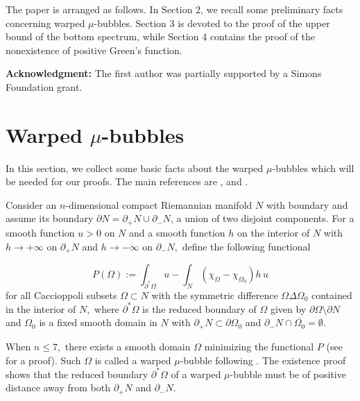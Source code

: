 \documentclass{amsart}
\numberwithin{equation}{section}
\begin{document}
The paper is arranged as follows. In Section 2, we recall some preliminary facts concerning warped $\mu$-bubbles. Section 3 is devoted to the proof 
of the upper bound of the bottom spectrum, while Section 4 contains the proof of the nonexistence of positive Green's function.



\textbf{Acknowledgment:}   The first author was
partially supported by a Simons Foundation
grant.

\section{Warped $\mu$-bubbles}

In this section, we collect some basic facts about the warped $\mu$-bubbles which will be needed for our proofs.
The main references are \cite{Z}, \cite{G} and \cite{CL}. 

Consider an $n$-dimensional compact Riemannian manifold $N$ with boundary and assume its boundary $\partial N=\partial_{+} N\cup \partial_{-}N$, a union of two
disjoint components. For a smooth function $u>0$ on $N$ and a smooth function $h$ on the interior of $N$ with $h\to +\infty$ on $\partial_{+} N$ and $h\to -\infty$ 
on $\partial_{-} N,$ define the following functional 

\begin{equation}
P\left( \Omega \right) :=\int_{\partial ^{\ast }\Omega }u-\int_{N}\left(
\chi _{\Omega }-\chi _{\Omega _{0}}\right) h\,u \label{P}
\end{equation}
for all Caccioppoli subsets $\Omega\subset N$ with the symmetric difference
$\Omega\Delta \Omega_0$ contained in the interior of $N,$ where 
$\partial ^{\ast }\Omega$ is the reduced boundary of $\Omega$
given by $\partial \Omega\setminus \partial N$ and $\Omega_0$ is a fixed smooth domain in $N$
with $\partial_{+} N\subset \partial \Omega_0$ and $\partial_{-} N\cap \overline{\Omega_0}=\emptyset.$

When $n\leq 7,$ there exists a smooth domain $\Omega$ minimizing the functional $P$ (see \cite{Z, CL} for a proof). 
Such $\Omega$ is called a warped $\mu$-bubble following \cite{CL}. The existence proof shows that the reduced boundary
$\partial ^{\ast }\Omega$ of a warped $\mu$-bubble must be of positive distance away from both $\partial_{+} N$ and $\partial_{-} N.$
\end{document}
